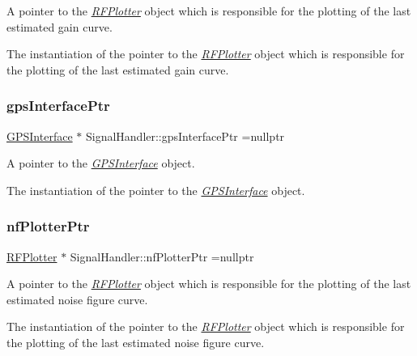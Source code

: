 A pointer to the {\itshape \hyperlink{classRFPlotter}{R\+F\+Plotter}} object which is responsible for the plotting of the last estimated gain curve. 

The instantiation of the pointer to the {\itshape \hyperlink{classRFPlotter}{R\+F\+Plotter}} object which is responsible for the plotting of the last estimated gain curve. \mbox{\label{classSignalHandler_ac6bc3decceefdff9d3e5c15e4125fe08}} 
\subsubsection{\texorpdfstring{gps\+Interface\+Ptr}{gpsInterfacePtr}}
{\footnotesize\ttfamily \hyperlink{classGPSInterface}{G\+P\+S\+Interface} $\ast$ Signal\+Handler\+::gps\+Interface\+Ptr =nullptr\hspace{0.3cm}{\ttfamily [static]}}



A pointer to the {\itshape \hyperlink{classGPSInterface}{G\+P\+S\+Interface}} object. 

The instantiation of the pointer to the {\itshape \hyperlink{classGPSInterface}{G\+P\+S\+Interface}} object. \mbox{\label{classSignalHandler_ad5f57e0f7a4ca52357bdd00c358d3a3a}} 
\subsubsection{\texorpdfstring{nf\+Plotter\+Ptr}{nfPlotterPtr}}
{\footnotesize\ttfamily \hyperlink{classRFPlotter}{R\+F\+Plotter} $\ast$ Signal\+Handler\+::nf\+Plotter\+Ptr =nullptr\hspace{0.3cm}{\ttfamily [static]}}



A pointer to the {\itshape \hyperlink{classRFPlotter}{R\+F\+Plotter}} object which is responsible for the plotting of the last estimated noise figure curve. 

The instantiation of the pointer to the {\itshape \hyperlink{classRFPlotter}{R\+F\+Plotter}} object which is responsible for the plotting of the last estimated noise figure curve. \mbox{\label{classSignalHandler_a9ce3533694e1e412496dc5a9b339ccc3}} 
